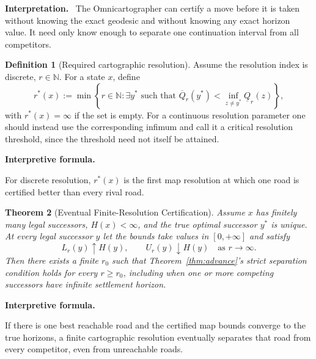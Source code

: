 \documentclass[11pt]{article}
\newtheorem{theorem}{Theorem}[section]
\theoremstyle{definition}
\newtheorem{definition}[theorem]{Definition}
\theoremstyle{remark}
\newcommand{\Qval}{Q}
\newenvironment{interpretiveformula}{%
  \begin{center}\begin{minipage}{0.92\linewidth}\small
  \textbf{Interpretive formula.}\ \raggedright}{\end{minipage}\end{center}}
\newenvironment{interpretation}{%
  \begin{center}\begin{minipage}{0.92\linewidth}\small
  \textbf{Interpretation.}\ }{\end{minipage}\end{center}}
\begin{document}
\begin{interpretation}
The Omnicartographer can certify a move before it is taken without knowing the exact geodesic and without knowing any exact horizon value. It need only know enough to separate one continuation interval from all competitors.
\end{interpretation}

\begin{definition}[Required cartographic resolution]
Assume the resolution index is discrete, $r\in\mathbb N$. For a state $x$, define
\[
r^*(x):=\min\left\{r\in\mathbb N:\exists y^*\text{ such that }\overline{\Qval}_r(y^*)<\inf_{z\neq y^*}\underline{\Qval}_r(z)\right\},
\]
with $r^*(x)=\infty$ if the set is empty. For a continuous resolution parameter one should instead use the corresponding infimum and call it a critical resolution threshold, since the threshold need not itself be attained.
\end{definition}

\begin{interpretiveformula}
For discrete resolution, $r^*(x)$ is the first map resolution at which one road is certified better than every rival road.
\end{interpretiveformula}

\begin{theorem}[Eventual Finite-Resolution Certification]\label{thm:eventual}
Assume $x$ has finitely many legal successors, $H(x)<\infty$, and the true optimal successor $y^*$ is unique. At every legal successor $y$ let the bounds take values in $[0,+\infty]$ and satisfy
\[
L_r(y)\uparrow H(y),\qquad U_r(y)\downarrow H(y)
\quad\text{as }r\to\infty.
\]
Then there exists a finite $r_0$ such that Theorem~\ref{thm:advance}'s strict separation condition holds for every $r\ge r_0$, including when one or more competing successors have infinite settlement horizon.
\end{theorem}

\begin{interpretiveformula}
If there is one best reachable road and the certified map bounds converge to the true horizons, a finite cartographic resolution eventually separates that road from every competitor, even from unreachable roads.
\end{interpretiveformula}
\end{document}
